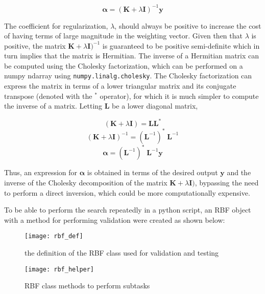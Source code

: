\documentclass{article}
\begin{document}
\begin{equation}
\boldsymbol\alpha = (\mathbf{K} + \lambda \mathbf{I})^{-1} \mathbf{y}
\end{equation}

The coefficient for regularization, $\lambda$, should always be positive to increase the cost of having terms of large magnitude in the weighting vector. Given then that $\lambda$ is positive, the matrix $\mathbf{K} + \lambda \mathbf{I})^{-1}$ is guaranteed to be positive semi-definite which in turn implies that the matrix is Hermitian. The inverse of a Hermitian matrix can be computed using the Cholesky factorization, which can be performed on a numpy ndarray using \verb+numpy.linalg.cholesky+. The Cholesky factorization can express the matrix in terms of a lower triangular matrix and its conjugate transpose (denoted with the $^*$ operator), for which it is much simpler to compute the inverse of a matrix. Letting $\mathbf{L}$ be a lower diagonal matrix,

\begin{equation}
(\mathbf{K} + \lambda \mathbf{I}) = \mathbf{L} \mathbf{L}^*
\end{equation}
\begin{equation}
(\mathbf{K} + \lambda \mathbf{I})^{-1} = (\mathbf{L}^{-1})^* \;\mathbf{L}^{-1}
\end{equation}
\begin{equation}
\boldsymbol\alpha = (\mathbf{L}^{-1})^* \;\mathbf{L}^{-1} \mathbf{y}
\end{equation}

Thus, an expression for $\boldsymbol\alpha$ is obtained in terms of the desired output $\mathbf{y}$ and the inverse of the Cholesky decomposition of the matrix $\mathbf{K} + \lambda \mathbf{I})$, bypassing the need to perform a direct inversion, which could be more computationally expensive.

To be able to perform the search repeatedly in a python script, an RBF object with a method for performing validation were created as shown below:

\begin{figure}[H]
\centering
\texttt{[image: rbf\_def]}
\caption{the definition of the RBF class used for validation and testing}
\end{figure}

\begin{figure}[H]
\centering
\texttt{[image: rbf\_helper]}
\caption{RBF class methods to perform subtasks}
\end{figure}
\end{document}
